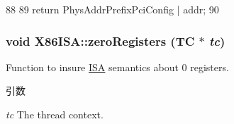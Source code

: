 \begin{DoxyCode}
88     {
89         return PhysAddrPrefixPciConfig | addr;
90     }
\end{DoxyCode}
\hypertarget{namespaceX86ISA_ac9d201d766da7a0a0f4831a76975c25c}{
\subsubsection[{zeroRegisters}]{\setlength{\rightskip}{0pt plus 5cm}void X86ISA::zeroRegisters (TC $\ast$ {\em tc})}}
\label{namespaceX86ISA_ac9d201d766da7a0a0f4831a76975c25c}
Function to insure \hyperlink{classX86ISA_1_1ISA}{ISA} semantics about 0 registers. 
\begin{DoxyParams}{引数}
\item[{\em tc}]The thread context. \end{DoxyParams}


